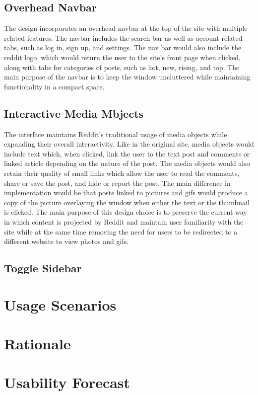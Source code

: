 \documentclass{article}
\begin{document}
\subsection{Overhead Navbar} The design incorporates an overhead navbar at the top of the site with multiple related features. The navbar includes the search bar as well as account related tabs, such as log in, sign up, and settings. The nav bar would also include the reddit logo, which would return the user to the site's front page when clicked, along with tabs for categories of posts, such as hot, new, rising, and top. The main purpose of the navbar is to keep the window uncluttered while maintaining functionality in a compact space.

\subsection{Interactive Media Mbjects} The interface maintains Reddit's traditional usage of media objects while expanding their overall interactivity. Like in the original site, media objects would include text which, when clicked, link the user to the text post and comments or linked article depending on the nature of the post. The media objects would also retain their quality of small links which allow the user to read the comments, share or save the post, and hide or report the post. The main difference in implementation would be that posts linked to pictures and gifs would produce a copy of the picture overlaying the window when either the text or the thumbnail is clicked. The main purpose of this design choice is to preserve the current way in which content is projected by Reddit and maintain user familiarity with the site while at the same time removing the need for users to be redirected to a different website to view photos and gifs.

\subsection{Toggle Sidebar}

\section{Usage Scenarios}

\section{Rationale}

\section{Usability Forecast}
\end{document}

